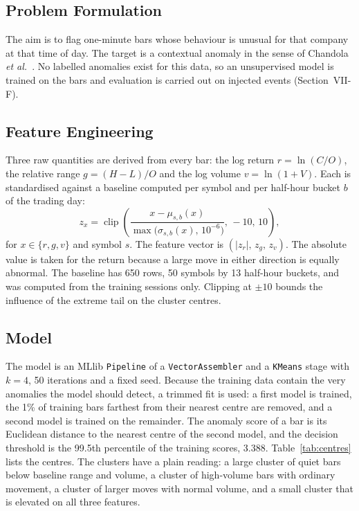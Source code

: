 \documentclass[conference]{IEEEtran}
\newcommand{\code}[1]{\texttt{#1}}
\begin{document}
\subsection{Problem Formulation}
The aim is to flag one-minute bars whose behaviour is unusual for that company at that time of day. The target is a contextual anomaly in the sense of Chandola \emph{et al.}\ \cite{chandola2009}. No labelled anomalies exist for this data, so an unsupervised model is trained on the bars and evaluation is carried out on injected events (Section~VII-F).

\subsection{Feature Engineering}
Three raw quantities are derived from every bar: the log return $r=\ln(C/O)$, the relative range $g=(H-L)/O$ and the log volume $v=\ln(1+V)$. Each is standardised against a baseline computed per symbol and per half-hour bucket $b$ of the trading day:
\begin{equation}
z_x=\operatorname{clip}\!\left(\frac{x-\mu_{s,b}(x)}{\max\!\big(\sigma_{s,b}(x),\,10^{-6}\big)},\,-10,\,10\right),
\end{equation}
for $x\in\{r,g,v\}$ and symbol $s$. The feature vector is $(|z_r|,\,z_g,\,z_v)$. The absolute value is taken for the return because a large move in either direction is equally abnormal. The baseline has 650 rows, 50 symbols by 13 half-hour buckets, and was computed from the training sessions only. Clipping at $\pm10$ bounds the influence of the extreme tail on the cluster centres.

\subsection{Model}
The model is an MLlib \code{Pipeline} of a \code{VectorAssembler} and a \code{KMeans} stage with $k=4$, 50 iterations and a fixed seed. Because the training data contain the very anomalies the model should detect, a trimmed fit is used: a first model is trained, the 1\% of training bars farthest from their nearest centre are removed, and a second model is trained on the remainder. The anomaly score of a bar is its Euclidean distance to the nearest centre of the second model, and the decision threshold is the 99.5th percentile of the training scores, 3.388. Table~\ref{tab:centres} lists the centres. The clusters have a plain reading: a large cluster of quiet bars below baseline range and volume, a cluster of high-volume bars with ordinary movement, a cluster of larger moves with normal volume, and a small cluster that is elevated on all three features.
\end{document}

